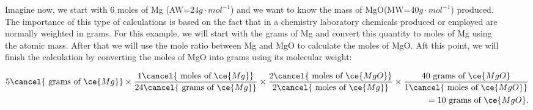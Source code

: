 \documentclass[main.tex]{subfiles}
\begin{document}
\begin{description}
\item[] 
Imagine now, we start with 6 moles of Mg (AW=$24g\cdot mol^{-1}$) and we want to know the mass of MgO(MW=$40g\cdot mol^{-1}$) produced. The importance of this type of calculations is based on the fact that in a chemistry laboratory chemicals produced or employed are normally weighted in grams. For this example, we will start with the grams of Mg and convert this quantity to moles of Mg using the atomic mass. After that we will use the mole ratio between Mg and MgO to calculate the moles of MgO. Aft this point, we will finish the calculation by converting the moles of MgO into grams using its molecular weight:

\begin{equation*}\begin{split}
5\cancel{\text{ grams of }\ce{Mg}}   \times  \dfrac{1 \cancel{\text{ moles of }\ce{Mg}}}{24\cancel{\text{ grams of }\ce{Mg}}}
 \times \dfrac{2\cancel{\text{ moles of }\ce{MgO}}}{2\cancel{\text{ moles of }\ce{Mg}}}
  \times  \dfrac{40\text{ grams of }\ce{MgO}}{1\cancel{\text{ moles of }\ce{MgO}}}\\
 =10\text{ grams of }\ce{MgO}.
\end{split}\end{equation*}



\end{description}
\end{document}
